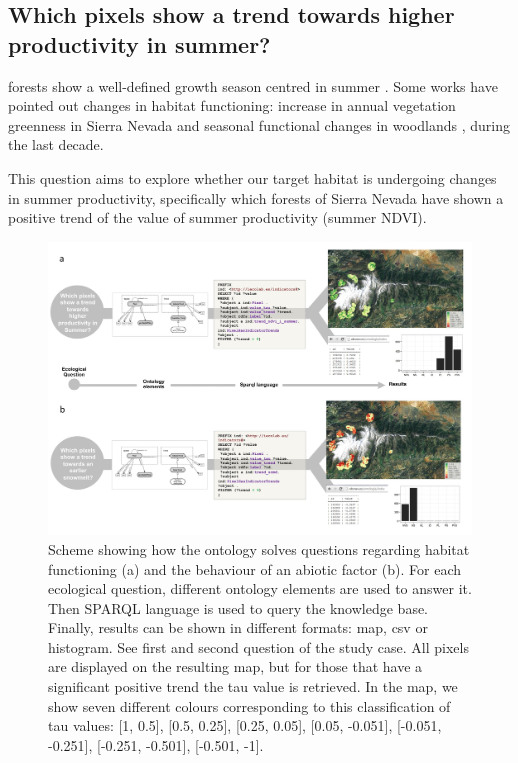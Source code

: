 \subsection{Which pixels show a trend towards higher productivity in summer?}\label{sec:onto:Trends}

\Qp forests show a well-defined growth season centred in summer \autocite{Alcarazetal2006IdentificationCurrent,Dionisioetal2012SatelliteBasedMonitoring}. Some works have pointed out changes in habitat functioning: increase in annual vegetation greenness in Sierra Nevada \autocite{AlcarazSeguraetal2008TrendsSurface,AlcarazSeguraetal2010EvaluatingConsistency} and seasonal functional changes in \Qp woodlands \autocite{Marty2008RegimeShift}, during the last decade.

This question aims to explore whether our target habitat is undergoing changes in summer productivity, specifically which \Qp forests of Sierra Nevada have shown a positive trend of the value of summer productivity (summer NDVI).

\begin{figure}
\centering
\includegraphics[width=.8\textwidth]{img/onto/onto-case-study}\caption{Scheme showing how the ontology solves questions regarding habitat functioning (a) and the behaviour of an abiotic factor (b). For each ecological question, different ontology elements are used to answer it. Then SPARQL language is used to query the knowledge base. Finally, results can be shown in different formats: map, csv or histogram. See first and second question of the study case. All pixels are displayed on the resulting map, but for those that have a significant positive trend the tau value is retrieved. In the map, we show seven different colours corresponding to this classification of tau values: [1, 0.5], [0.5, 0.25], [0.25, 0.05], [0.05, -0.051], [-0.051, -0.251], [-0.251, -0.501], [-0.501, -1].}\label{fig:casestudy}
\end{figure}

